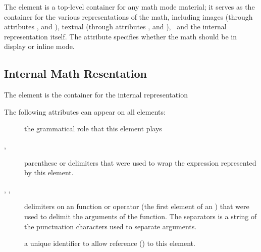 \documentclass{article}
\begin{document}
The  element is a top-level container for any math mode material; it
serves as the container for the various representations of the math, including
images (through attributes ,  and ), 
textual (through attributes ,  and ),
\MathML\ and the internal representation itself.  
The  attribute specifies whether the math should be in display or inline mode.

\subsection{Internal Math Resentation}\label{app:mathrep}
The  element is the container for the internal representation

The following attributes can appear on all  elements:
\begin{description}
\item[] the grammatical role that this element plays 
\item[, ] parenthese or delimiters that were used to wrap the
   expression represented by this element.
\item[, , ] delimiters on an function or operator
   (the first element of an )  that were used to delimit the arguments of the function.
    The separators is a string of the punctuation characters used to separate arguments.
\item[] a unique identifier to allow reference () to this element.
\end{description}
\end{document}
